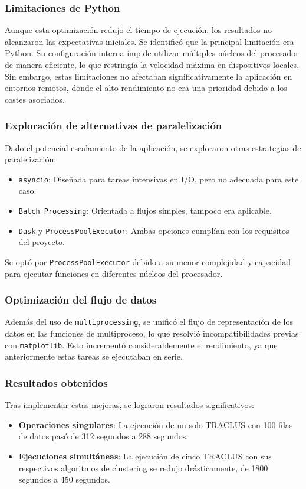 \subsubsection{Limitaciones de Python}
Aunque esta optimización redujo el tiempo de ejecución, los resultados no alcanzaron las expectativas iniciales. Se identificó que la principal limitación era Python. Su configuración interna impide utilizar múltiples núcleos del procesador de manera eficiente, lo que restringía la velocidad máxima en dispositivos locales. Sin embargo, estas limitaciones no afectaban significativamente la aplicación en entornos remotos, donde el alto rendimiento no era una prioridad debido a los costes asociados.

\subsubsection{Exploración de alternativas de paralelización}
Dado el potencial escalamiento de la aplicación, se exploraron otras estrategias de paralelización:
\begin{itemize}
	\item \texttt{asyncio}: Diseñada para tareas intensivas en I/O, pero no adecuada para este caso. 
	\item \texttt{Batch Processing}: Orientada a flujos simples, tampoco era aplicable.
	\item \texttt{Dask} y \texttt{ProcessPoolExecutor}: Ambas opciones cumplían con los requisitos del proyecto.
\end{itemize} 


Se optó por \texttt{ProcessPoolExecutor} debido a su menor complejidad y capacidad para ejecutar funciones en diferentes núcleos del procesador.

\subsubsection{Optimización del flujo de datos}
Además del uso de \texttt{multiprocessing}, se unificó el flujo de representación de los datos en las funciones de multiproceso, lo que resolvió incompatibilidades previas con \texttt{matplotlib}. Esto incrementó considerablemente el rendimiento, ya que anteriormente estas tareas se ejecutaban en serie.

\subsubsection{Resultados obtenidos}
Tras implementar estas mejoras, se lograron resultados significativos: 
\begin{itemize}
	\item \textbf{Operaciones singulares}: La ejecución de un solo TRACLUS con 100 filas de datos pasó de 312 segundos a 288 segundos. 
	\item \textbf{Ejecuciones simultáneas}: La ejecución de cinco TRACLUS con sus respectivos algoritmos de clustering se redujo drásticamente, de 1800 segundos a 450 segundos.
\end{itemize}

